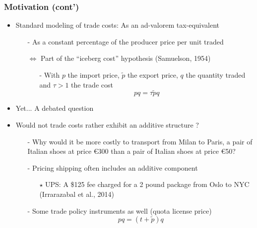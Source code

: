 \documentclass[10 pt,Helvetica, french]{beamer}
\begin{document}
\begin{frame}
\frametitle{Motivation (cont')}
\begin{itemize}
\item Standard modeling of trade costs: As an ad-valorem tax-equivalent \vspace{0.1cm}
\begin{itemize}
\item[-] As a constant percentage of the producer price per unit traded \vspace{0.1cm}
\item[$\Leftrightarrow$] Part of the ``iceberg cost'' hypothesis (Samuelson, 1954) \vspace{0.1cm}
\begin{itemize}
\item[-] With $p$ the import price, $\widetilde{p}$ the export price, $q$ the quantity traded and $\tau >1$ the trade cost \vspace{0.1cm}
\footnotesize
$$pq = \tau \widetilde{p}q$$
\normalsize
\end{itemize}
\end{itemize}
\item Yet... A debated question \vspace{0.1cm}
\item Would not trade costs rather exhibit an additive structure ?  \vspace{0.1cm} \vspace{0.1cm}
\begin{itemize}
\item[-] Why would it be more costly to transport from Milan to Paris, a pair of Italian shoes at price \euro 300 than a pair of Italian shoes at price \euro 50? \vspace{0.1cm}
\item[-] Pricing shipping often includes an additive component \vspace{0.1cm}
\begin{itemize}
\item[$\star$] UPS: A \$125 fee charged for a 2 pound package from Oslo to NYC (Irrarazabal et al., 2014) \vspace{0.1cm}
\end{itemize}
\item[-] Some trade policy instruments as well (quota license price)
\footnotesize
$$pq = (t+\widetilde{p})q  $$
\end{itemize}
\end{itemize}
\end{frame}
\end{document}
